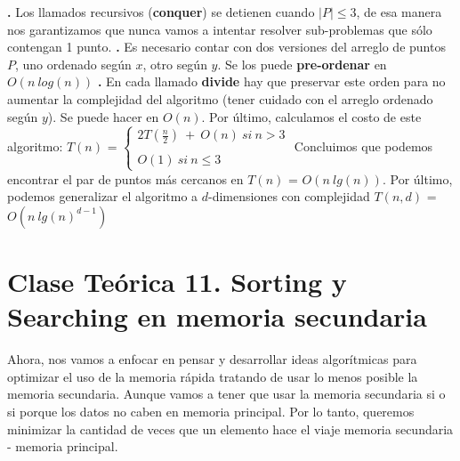 \documentclass[10pt,a4paper]{article}
\begin{document}
\newline
\textbf{.} Los llamados recursivos (\textbf{conquer}) se detienen cuando  $|P| \leq 3$, de esa manera nos garantizamos que nunca vamos a intentar resolver sub-problemas que sólo contengan 1 punto.
\newline
\newline
\textbf{.} Es necesario contar con dos versiones del arreglo de puntos $P$, uno ordenado según $x$, otro según $y$. Se los puede \textbf{pre-ordenar} en $O(n~log(n))$
\newline
\newline
\textbf{.} En cada llamado \textbf{divide} hay que preservar este orden para no aumentar la complejidad del algoritmo (tener cuidado con el arreglo ordenado según $y$). Se puede hacer en $O(n)$.
\newline
\newline
Por último, calculamos el costo de este algoritmo:
\newline
\newline
\newline
$T(n)$ = $\left\lbrace\begin{array}{c} 2T(\displaystyle \frac{n}{2})~+~O(n)~si~n>3 \\ \\ O(1)~si~n\leq3 \end{array}\right.$
\newline
\newline
Concluimos que podemos encontrar el par de puntos más cercanos en $T(n)$ = $O(n~lg(n))$.
\newline
\newline
Por último, podemos generalizar el algoritmo a $d$-dimensiones con complejidad $T(n,d)$ = $O(n~lg(n)^{d-1})$
\newpage

\section{Clase Teórica 11. Sorting y Searching en memoria secundaria}

Ahora, nos vamos a enfocar en pensar y desarrollar ideas algorítmicas para optimizar el uso de la memoria rápida tratando de usar lo menos posible la memoria secundaria. Aunque vamos a tener que usar la memoria secundaria si o si porque los datos no caben en memoria principal.
\newline
\newline
Por lo tanto, queremos minimizar la cantidad de veces que un elemento hace el viaje memoria secundaria - memoria principal.
\end{document}
